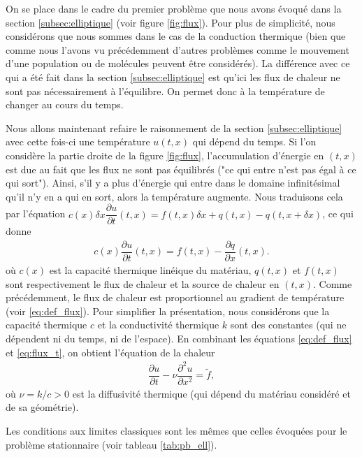 \documentclass[12pt,a4paper,twoside]{article}
\begin{document}
On se place dans le cadre du premier probl\`eme que nous avons \'evoqu\'e dans
la section \ref{subsec:elliptique} (voir figure \ref{fig:flux}). 
Pour plus de simplicit\'e, nous consid\'erons que nous sommes dans le cas
de la conduction thermique (bien que comme nous l'avons vu pr\'ec\'edemment
d'autres probl\`emes comme le mouvement d'une population ou de mol\'ecules
peuvent \^etre consid\'er\'es).
La diff\'erence avec ce qui a \'et\'e fait dans la section \ref{subsec:elliptique}
est qu'ici les flux de chaleur ne sont pas n\'ecessairement \`a l'\'equilibre.
On permet donc \`a la temp\'erature de changer au cours du temps.

Nous allons maintenant refaire le raisonnement de la section \ref{subsec:elliptique}
avec cette fois-ci une temp\'erature $u(t,x)$ qui d\'epend du temps.
Si l'on consid\`ere la partie droite de la figure \ref{fig:flux}, l'accumulation
d'\'energie en $(t,x)$ est due au fait que les flux ne sont pas \'equilibr\'es
("ce qui entre n'est pas \'egal \`a ce qui sort").
Ainsi, s'il y a plus d'\'energie qui entre dans le domaine infinit\'esimal
qu'il n'y en a qui en sort,
alors la temp\'erature augmente.
Nous traduisons cela par l'\'equation
$c (x) \delta x \dfrac{\partial u}{\partial t}(t,x) = f(t,x) \delta x 
  + q(t,x) - q(t,x + \delta x)$, ce qui donne
\begin{align}
  \label{eq:flux_t}
  c (x) \dfrac{\partial u}{\partial t}(t,x) = f(t,x) - \dfrac{\partial q}{\partial x} (t,x) .
\end{align}
o\`u $c(x)$ est la capacit\'e thermique lin\'eique du mat\'eriau,
$q(t,x)$ et $f(t,x)$ sont respectivement le flux de chaleur 
et la source de chaleur en $(t,x)$.
Comme pr\'ec\'edemment, le flux de chaleur est proportionnel au gradient 
de temp\'erature (voir \eqref{eq:def_flux}).
Pour simplifier la pr\'esentation, nous consid\'erons que la capacit\'e
thermique $c$ et la conductivit\'e thermique $k$ sont des constantes 
(qui ne d\'ependent ni du temps, ni de l'espace).
En combinant les \'equations \eqref{eq:def_flux} et \eqref{eq:flux_t},
on obtient l'\'equation de la chaleur
\begin{align}
  \label{eq:chaleur}
  \dfrac{\partial u}{\partial t} - \nu \dfrac{\partial^2 u}{\partial x^2} = \widetilde{f} ,
\end{align}
o\`u $\nu = k/c > 0$ est la diffusivit\'e thermique 
(qui d\'epend du mat\'eriau consid\'er\'e et de sa g\'eom\'etrie).


Les conditions aux limites classiques sont les m\^emes que celles \'evoqu\'ees pour le probl\`eme
stationnaire (voir tableau \ref{tab:pb_ell}).
\end{document}
